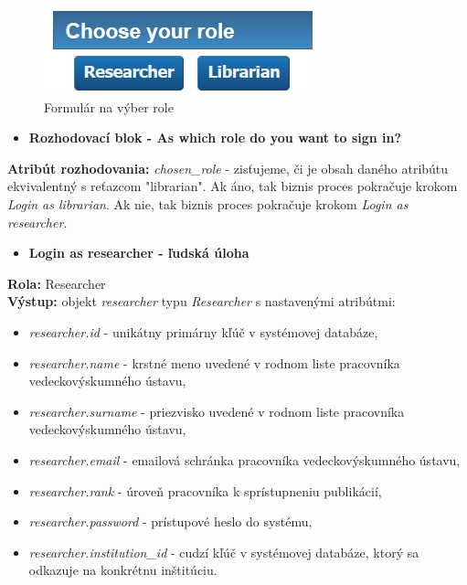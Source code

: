 \documentclass[10pt,oneside,slovak,a4paper]{article}
\begin{document}
\begin{figure} [H]
\centering
\includegraphics[scale=0.7]{forms/formChooseRole.jpg} 
\caption{Formulár na výber role}
\end{figure}

\begin{itemize}
\item \textbf{Rozhodovací blok - As which role do you want to sign in?}
\end{itemize}

\textbf{Atribút rozhodovania:} \textit{chosen\_role} - zisťujeme, či je obsah daného atribútu ekvivalentný s reťazcom "librarian". Ak áno, tak biznis proces pokračuje krokom \textit{Login as librarian}. Ak nie, tak biznis proces pokračuje krokom \textit{Login as researcher}.

\begin{itemize}
\item \textbf{Login as researcher - ľudská úloha}
\end{itemize}

\textbf{Rola:} Researcher\\
\textbf{Výstup:} objekt \textit{researcher} typu \textit{Researcher} s nastavenými atribútmi:

\begin{itemize}
\item \textit{researcher.id} - unikátny primárny kľúč v systémovej databáze,
\item \textit{researcher.name} - krstné meno uvedené v rodnom liste pracovníka vedeckovýskumného ústavu,
\item \textit{researcher.surname} -  priezvisko uvedené v rodnom liste pracovníka vedeckovýskumného ústavu,
\item \textit{researcher.email} - emailová schránka pracovníka vedeckovýskumného ústavu,
\item \textit{researcher.rank} - úroveň pracovníka k sprístupneniu publikácií,
\item \textit{researcher.password} - prístupové heslo do systému,
\item \textit{researcher.institution\_id} - cudzí kľúč v systémovej databáze, ktorý sa odkazuje na konkrétnu inštitúciu.
\end{itemize}
\end{document}
